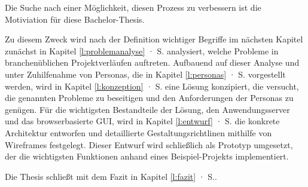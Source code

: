 \bigskip

Die Suche nach einer Möglichkeit, diesen Prozess zu verbessern ist die Motiviation für diese Bachelor-Thesis. 

\bigskip

Zu diesem Zweck wird nach der Definition wichtiger Begriffe im nächsten Kapitel zunächst in Kapitel \ref{l:problemanalyse} · S.\pageref{l:problemanalyse} analysiert, welche Probleme in branchenüblichen Projektverläufen auftreten. Aufbauend auf dieser Analyse und unter Zuhilfenahme von Personas, die in Kapitel \ref{l:personas} · S.\pageref{l:personas} vorgestellt werden, wird in Kapitel \ref{l:konzeption} · S.\pageref{l:konzeption} eine Lösung konzipiert, die versucht, die genannten Probleme zu beseitigen und den Anforderungen der Personas zu genügen. Für die wichtigsten Bestandteile der Lösung, den Anwendungsserver und das browserbasierte GUI, wird in Kapitel \ref{l:entwurf} · S.\pageref{l:entwurf} die konkrete Architektur entworfen und detaillierte Gestaltungsrichtlinen mithilfe von Wireframes festgelegt. Dieser Entwurf wird schließlich als Prototyp umgesetzt, der die wichtigsten Funktionen anhand eines Beispiel-Projekts implementiert.

Die Thesis schließt mit dem Fazit in Kapitel \ref{l:fazit} · S.\pageref{l:fazit}.

\pagebreak